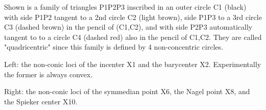Shown is a family of triangles P1P2P3 inscribed in an outer circle C1 (black) with side P1P2 tangent to a 2nd circle C2 (light brown), side P1P3 to a 3rd circle C3 (dashed brown) in the pencil of (C1,C2), and with side P2P3 automatically tangent to to a circle C4 (dashed red) also in the pencil of C1,C2. They are called "quadricentric" since this family is defined by 4 non-concentric circles.

Left: the non-conic loci of the incenter X1 and the barycenter X2. Experimentally the former is always convex.

Right: the non-conic loci of the symmedian point X6, the Nagel point X8, and the Spieker center X10.